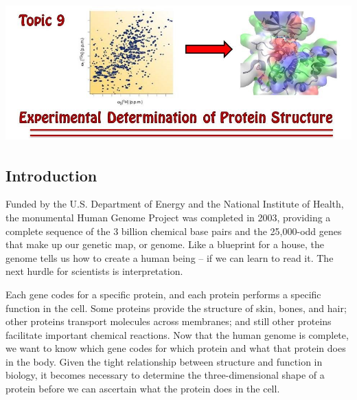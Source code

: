 \setcounter{chapter}{9}
\setcounter{section}{0}
\setcounter{figure}{0}
\setcounter{equation}{0}
\setcounter{table}{0}
\chapter*{\includegraphics[width=\textwidth]{./figures/Topic9/Topic9.jpg}}

\section{Introduction}

Funded by the U.S. Department of Energy and the National Institute of Health, the monumental Human Genome Project was completed in 2003, providing a complete sequence of the 3 billion chemical base pairs and the 25,000-odd genes that make up our genetic map, or genome.  Like a blueprint for a house, the genome tells us how to create a human being -- if we can learn to read it.  The next hurdle for scientists is interpretation.

Each gene codes for a specific protein, and each protein performs a specific function in the cell.  Some proteins provide the structure of skin, bones, and hair; other proteins transport molecules across membranes; and still other proteins facilitate important chemical reactions.  Now that the human genome is complete, we want to know which gene codes for which protein and what that protein does in the body.  Given the tight relationship between structure and function in biology, it becomes necessary to determine the three-dimensional shape of a protein before we can ascertain what the protein does in the cell.  

